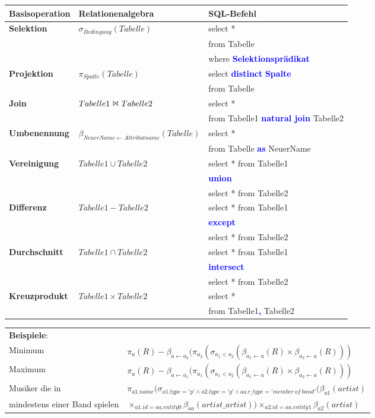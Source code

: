 \documentclass{scrartcl}
\newcommand{\key}[1]{{\textcolor{blue}{\textbf{#1}}}}
\begin{document}
{\renewcommand{\arraystretch}{1.2}
\begin{tabular}{|lll|}
	\hline 
	Basisoperation & Relationenalgebra & SQL-Befehl \\
	\hline
	\textbf{Selektion} & $\sigma_{Bedingung}(Tabelle)$ & select * \\&&from Tabelle \\&&where \key{Selektionsprädikat} \\
	\textbf{Projektion} & $\pi_{Spalte}(Tabelle)$  & select \key{distinct} \key{Spalte} \\&&from Tabelle \\
	\textbf{Join} & $Tabelle1\ \Bowtie\ Tabelle2$ & select * \\&&from Tabelle1 \key{natural  join} Tabelle2 \\
	\textbf{Umbenennung} & $\beta_{NeuerName\leftarrow Attributname}(Tabelle)$  & select * \\&&from Tabelle \key{as} NeuerName \\
	\textbf{Vereinigung} & $Tabelle1\cup Tabelle2$ & select * from Tabelle1 \\&& \key{union} \\&& select * from Tabelle2 \\
	\textbf{Differenz} & $Tabelle1 - Tabelle2$ & select * from Tabelle1 \\&& \key{except} \\&& select * from Tabelle2 \\
	\textbf{Durchschnitt} & $Tabelle1\cap Tabelle2$ & select * from Tabelle1 \\&& \key{intersect} \\&& select * from Tabelle2 \\
	\textbf{Kreuzprodukt} & $Tabelle1\times Tabelle2$ & select * \\&& from Tabelle1\key{,} Tabelle2 \\
	\hline
\end{tabular}
}

\begin{tabular}{p{3cm}l}
	\textbf{Beispiele}: & \\
	Minimum & $\pi_a(R) - \beta_{a\leftarrow a_2}(\pi_{a_2}(\sigma_{a_1 < a_2}( \beta_{a_1\leftarrow a}(R) \times \beta_{a_2\leftarrow a}(R ) ) ) $ \\
	Maximum & $\pi_a(R) - \beta_{a\leftarrow a_1}(\pi_{a_1}(\sigma_{a_1 < a_2}( \beta_{a_1\leftarrow a}(R) \times \beta_{a_2\leftarrow a}(R ) ) ) $ \\
	Musiker die in  & $\pi_{a1.name}(\sigma_{a1.type='p'\wedge a2.type='g'\wedge aa.r\_type='member\ of\ band'} ( \beta_{a1}(artist) $ \\
	mindestens einer Band spielen& $ \times_{a1.id = aa.entity0} \beta_{aa}(artist\_artist) ) \times_{a2.id = aa.entity1} \beta_{a2} (artist)    $ \\
\end{tabular}
\end{document}

